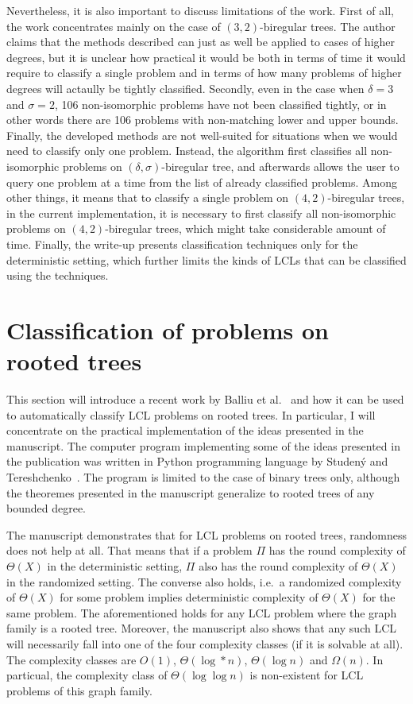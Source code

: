 Nevertheless, it is also important to discuss limitations of the work. First of all,
the work concentrates mainly on the case of $(3, 2)$-biregular trees. The author claims that
the methods described can just as well be applied to cases of higher degrees, but it is unclear
how practical it would be both in terms of time it would require to classify a single problem
and in terms of how many problems of higher degrees will actaully be tightly classified. Secondly,
even in the case when $\delta = 3$ and $\sigma = 2$, 106 non-isomorphic problems have not been
classified tightly, or in other words there are 106 problems with non-matching lower and upper bounds.
Finally, the developed methods are not well-suited for situations when we would need to
classify only one problem. Instead, the algorithm first classifies all non-isomorphic
problems on $(\delta, \sigma)$-biregular tree, and afterwards allows the user to query
one problem at a time from the list of already classified problems. Among other things,
it means that to classify a single problem on $(4, 2)$-biregular trees, in the current
implementation, it is necessary to first classify all non-isomorphic problems on $(4, 2)$-biregular trees,
which might take considerable amount of time. Finally, the write-up presents classification
techniques only for the deterministic setting, which further limits the kinds of LCLs that
can be classified using the techniques.

\section{Classification of problems on rooted trees}

This section will introduce a recent work by Balliu et al.~\cite{Balliu2021}
and how it can be used to automatically classify LCL problems on rooted trees.
In particular, I will concentrate on the practical implementation of the
ideas presented in the manuscript. The computer program implementing some of the ideas presented in the
publication was written in Python programming language by Studený and
Tereshchenko~\cite{Studeny2021}. The program is limited to the case
of binary trees only, although the theoremes presented in the manuscript
generalize to rooted trees of any bounded degree.

The manuscript demonstrates that for LCL problems on rooted trees,
randomness does not help at all. That means that if a problem $\Pi$
has the round complexity of $\Theta(X)$ in the deterministic setting, $\Pi$
also has the round complexity of $\Theta(X)$ in the randomized setting. The
converse also holds, i.e.\ a randomized complexity of $\Theta(X)$ for some
problem implies deterministic complexity of $\Theta(X)$ for the same problem.
The aforementioned holds for any LCL problem where the graph family is
a rooted tree. Moreover, the manuscript also shows that any such LCL will
necessarily fall into one of the four complexity classes (if it is solvable at all). The complexity classes are $O(1)$, $\Theta(\log* n)$, $\Theta(\log n)$
and $\Omega(n)$. In particual, the complexity class of $\Theta(\log \log n)$
is non-existent for LCL problems of this graph family.

